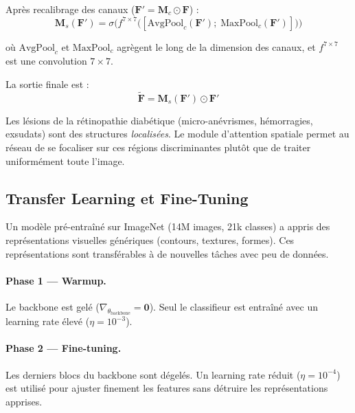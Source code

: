 \documentclass[11pt,a4paper]{article}
\begin{document}
Après recalibrage des canaux ($\mathbf{F}' = \mathbf{M}_c \odot \mathbf{F}$) :
\begin{equation}
  \mathbf{M}_s(\mathbf{F}') = \sigma\!\Big(f^{7 \times 7}\big([\text{AvgPool}_c(\mathbf{F}');\;\text{MaxPool}_c(\mathbf{F}')]\big)\Big)
\end{equation}

où $\text{AvgPool}_c$ et $\text{MaxPool}_c$ agrègent le long de la dimension des canaux, et $f^{7 \times 7}$ est une convolution $7 \times 7$.

La sortie finale est :
\begin{equation}
  \boxed{\widetilde{\mathbf{F}} = \mathbf{M}_s(\mathbf{F}') \odot \mathbf{F}'}
\end{equation}

\begin{notebox}
Les lésions de la rétinopathie diabétique (micro-anévrismes, hémorragies, exsudats) sont des structures \emph{localisées}. Le module d'attention spatiale permet au réseau de se focaliser sur ces régions discriminantes plutôt que de traiter uniformément toute l'image.
\end{notebox}

\subsection{Transfer Learning et Fine-Tuning}

\begin{defbox}
Un modèle pré-entraîné sur ImageNet (14M images, 21k classes) a appris des représentations visuelles génériques (contours, textures, formes). Ces représentations sont transférables à de nouvelles tâches avec peu de données.
\end{defbox}

\paragraph{Phase 1 --- Warmup.} Le backbone est gelé ($\nabla_{\theta_{\text{backbone}}} = \mathbf{0}$). Seul le classifieur est entraîné avec un learning rate élevé ($\eta = 10^{-3}$).

\paragraph{Phase 2 --- Fine-tuning.} Les derniers blocs du backbone sont dégelés. Un learning rate réduit ($\eta = 10^{-4}$) est utilisé pour ajuster finement les features sans détruire les représentations apprises.
\end{document}
